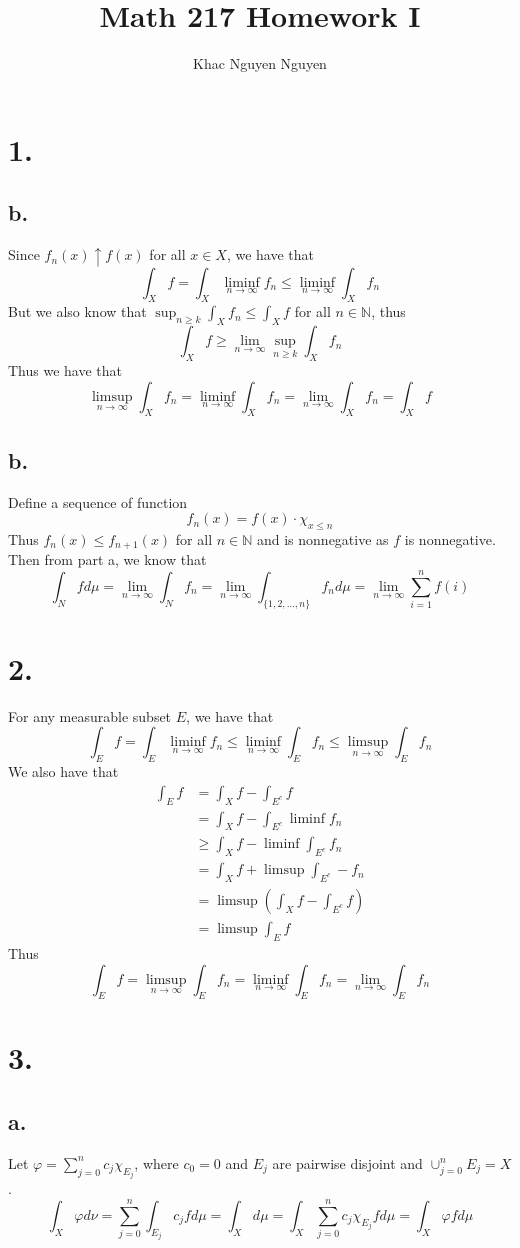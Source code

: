 \documentclass[11pt]{article}
\title{\textbf{Math 217 Homework I}}
\author{Khac Nguyen Nguyen}
\date{}
\theoremstyle{mystyle}
\theoremstyle{definition}
\begin{document}
\section*{1.}
\subsection*{b.}
Since $f_n(x) \uparrow f(x)$ for all $x \in X$, we have that 
\[
  \int_X f = \int_X \liminf_{n \to \infty} f_n \le \liminf_{n \to \infty} \int_X f_n 
\]
But we also know that $\sup_{n \ge k} \int_X f_n \le \int_X f$ for all $n \in \mathbb{N}$, thus 
\[
  \int_X f \ge \lim_{n \to \infty} \sup_{n \ge k} \int_X f_n 
\] 
Thus we have that 
\[
  \limsup_{n \to \infty} \int_X f_n = \liminf_{n \to \infty} \int_X f_n = \lim_{n \to \infty} \int_X f_n = \int_X f
\]
\subsection*{b.}
Define a sequence of function
\[
  f_n(x) = f(x) \cdot \chi_{x \le n}
\]
Thus $f_n(x) \le f_{n+1}(x)$ for all $n \in \mathbb{N}$ and is nonnegative as $f$ is nonnegative. Then from part a, we know that 
\[
  \int_N f d\mu = \lim_{n\to \infty} \int_N f_n = \lim_{n \to \infty} \int_{\{1,2,\hdots, n\}} f_n d\mu = \lim_{n \to \infty} \sum_{i=1}^n f(i) 
\]
\newpage
\section*{2.}
For any measurable subset $E$, we have that 
\[
  \int_E f = \int_E \liminf_{n \to \infty} f_n \le \liminf_{n \to \infty} \int_E f_n \le \limsup_{n \to \infty} \int_E f_n
\]
We also have that
\begin{align*}
  \int_E f &= \int_X f - \int_{E^c} f \\
  &= \int_X f - \int_{E^c} \liminf f_n \\
  &\ge \int_X f - \liminf \int_{E^c} f_n \\
  &= \int_X f + \limsup \int_{E^c} -f_n \\
  &= \limsup \left( \int_X f - \int_{E^c} f \right) \\ 
  &=\limsup \int_E f 
\end{align*}
Thus 
\[
  \int_E f = \limsup_{n \to \infty} \int_E f_n = \liminf_{n \to \infty} \int_E f_n = \lim_{n \to \infty} \int_E f_n
\]
\newpage
\section*{3.}
\subsection*{a.}
Let $\varphi = \sum_{j=0}^n c_j \chi_{E_j}$, where $c_0 = 0$ and $E_j$ are pairwise disjoint and $\cup_{j=0}^n E_j = X$.  
\[
  \int_X \varphi d\nu =\sum_{j=0}^n \int_{E_j} c_j f d\mu = \int_{X}  d\mu = \int_X \sum_{j=0}^n c_j \chi_{E_j} f d\mu = \int_X \varphi f d\mu
\]
\end{document}
